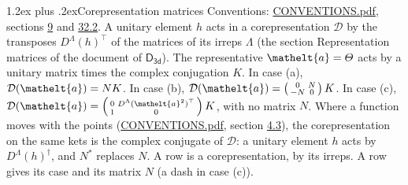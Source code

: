 \documentclass[10pt,a4paper]{article}
\makeatletter
\renewcommand\section{\@startsection{section}{1}{\z@}{-3ex plus -1ex minus -.2ex}%
  {1.2ex plus .2ex}{\normalfont\large\sffamily\bfseries\color{parttitle}}}
\numberwithin{equation}{section}
\newcommand{\eltfont}[1]{{\let\sigma\eltsigma\mathelt{#1}}}
\newcommand{\grp}[1]{\mathsf{#1}}
\newcommand{\elt}[1]{\eltfont{#1}}
\makeatother
\begin{document}
\section{Corepresentation matrices}\label{s:corep_matrices}
Conventions: \href{../../CONVENTIONS.pdf}{CONVENTIONS.pdf}, sections \href{../../../rotation/CONVENTIONS.pdf\#conv.9}{9} and \href{../../CONVENTIONS.pdf\#conv.32.2}{32.2}.
A unitary element $h$ acts in a corepresentation $\mathcal{D}$ by the transposes $D^{\Lambda}(h)^{\top}$ of the matrices of its irreps $\Lambda$ (the section Representation matrices of the document of \href{../../../rotation/data/pdf/D3d.pdf}{$\grp{D_{3d}}$}). The representative $\elt{a} = \varTheta$ acts by a unitary matrix times the complex conjugation $K$.
In case (a), $\mathcal{D}(\elt{a}) = NK$. In case (b), $\mathcal{D}(\elt{a}) = \left(\begin{smallmatrix} 0 & N \\ -N & 0 \end{smallmatrix}\right) K$. In case (c), $\mathcal{D}(\elt{a}) = \left(\begin{smallmatrix} 0 & D^{\Lambda}(\elt{a}^2)^{\top} \\ 1 & 0 \end{smallmatrix}\right) K$, with no matrix $N$.
Where a function moves with the points (\href{../../CONVENTIONS.pdf}{CONVENTIONS.pdf}, section \href{../../../rotation/CONVENTIONS.pdf\#conv.4.3}{4.3}), the corepresentation on the same kets is the complex conjugate of $\mathcal{D}$: a unitary element $h$ acts by $D^{\Lambda}(h)^{\dagger}$, and $N^{*}$ replaces $N$.
A row is a corepresentation, by its irreps. A row gives its case and its matrix $N$ (a dash in case (c)).
\end{document}
